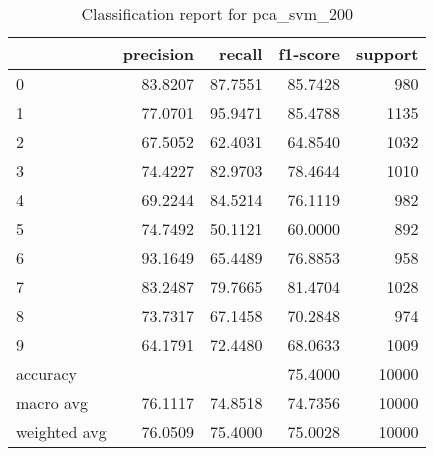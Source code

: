 \begin{table}[htb!]
\centering
\begin{tabular}{lrrrr}
    \toprule
 & precision & recall & f1-score & support \\
 \midrule
 0 & 83.8207 & 87.7551 & 85.7428 & 980 \\
 1 & 77.0701 & 95.9471 & 85.4788 & 1135 \\
 2 & 67.5052 & 62.4031 & 64.8540 & 1032 \\
 3 & 74.4227 & 82.9703 & 78.4644 & 1010 \\
4 & 69.2244 & 84.5214 & 76.1119 & 982 \\
5 & 74.7492 & 50.1121 & 60.0000 & 892 \\
6 & 93.1649 & 65.4489 & 76.8853 & 958 \\
7 & 83.2487 & 79.7665 & 81.4704 & 1028 \\
8 & 73.7317 & 67.1458 & 70.2848 & 974 \\
9 & 64.1791 & 72.4480 & 68.0633 & 1009 \\
accuracy & & & 75.4000 & 10000 \\
macro avg & 76.1117 & 74.8518 & 74.7356 & 10000 \\
weighted avg & 76.0509 & 75.4000 & 75.0028 & 10000 \\
\bottomrule
\end{tabular}
\caption{Classification report for pca_svm_200}
\label{tab:classification-report-pca_svm_200}
\end{table}
